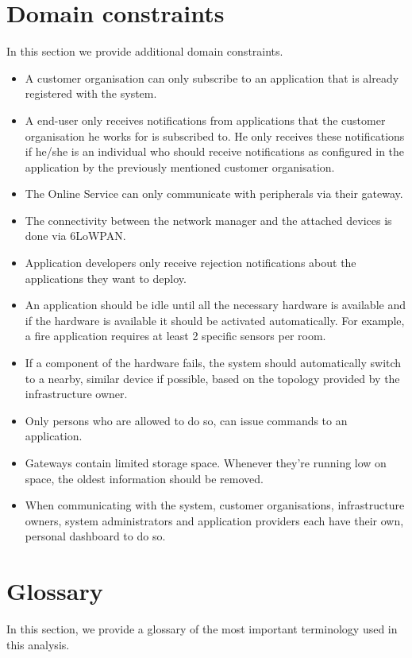 \documentclass[english]{sareport}
\begin{document}
\section{Domain constraints}
In this section we provide additional domain constraints.

\begin{itemize}
    \item A customer organisation can only subscribe to an application that is already registered with the system.
    \item A end-user only receives notifications from applications that the customer organisation he works for is subscribed to. He only receives these notifications if he/she is an individual who should receive notifications as configured in the application by the previously mentioned customer organisation.
    \item The Online Service can only communicate with peripherals via their gateway.
    \item The connectivity between the network manager and the attached devices is done via 6LoWPAN.
    \item Application developers only receive rejection notifications about the applications they want to deploy.
    \item An application should be idle until all the necessary hardware is available and if the hardware is available it should be activated automatically. For example, a fire application requires at least 2 specific sensors per room.
    \item If a component of the hardware fails, the system should automatically switch to a nearby, similar device if possible, based on the topology provided by the infrastructure owner.
    \item Only persons who are allowed to do so, can issue commands to an application.
    \item Gateways contain limited storage space. Whenever they're running low on space, the oldest information should be removed.
    \item When communicating with the system, customer organisations, infrastructure owners, system administrators and application providers each have their own, personal dashboard to do so.
\end{itemize}

\section{Glossary}
In this section, we provide a glossary of the most important terminology used
in this analysis.
\end{document}
